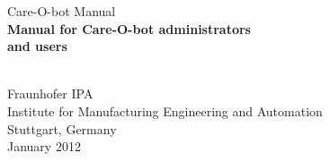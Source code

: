 %
%
\begin{titlepage}
\vspace*{13mm}
\begin{center}
  \vspace{10mm} 
         {\large \hspace{20mm} Care-O-bot Manual\\}
  \vspace{10mm}
       {\Large
          \bf
          \hspace{20mm} Manual for Care-O-bot administrators\\} 
       {\Large
          \bf
          \hspace{20mm} and users\\}

  \vspace{80mm}
  \makebox[40mm]{}\\
  \vspace{10mm}
         {\large \hspace{20mm} Fraunhofer IPA} \\
  \vspace{5mm}
         {\large \hspace{20mm} Institute for Manufacturing Engineering and Automation} \\
         {\large \hspace{20mm} Stuttgart, Germany} \\
  \vfill
         {\large \hspace{20mm} January 2012}
\end{center}
\end{titlepage}

\clearpage
\thispagestyle{empty}
\cleardoublepage